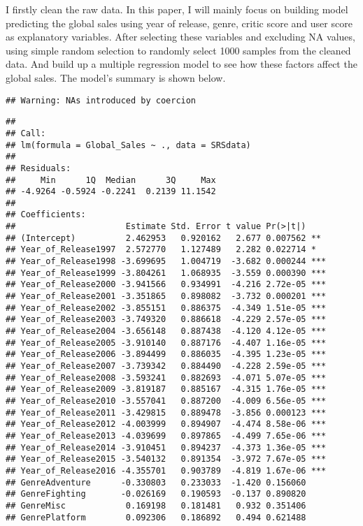 \documentclass[
]{article}
\begin{document}
I firstly clean the raw data. In this paper, I will mainly focus on
building model predicting the global sales using year of release, genre,
critic score and user score as explanatory variables. After selecting
these variables and excluding NA values, using simple random selection
to randomly select 1000 samples from the cleaned data. And build up a
multiple regression model to see how these factors affect the global
sales. The model's summary is shown below.

\begin{verbatim}
## Warning: NAs introduced by coercion
\end{verbatim}

\begin{verbatim}
## 
## Call:
## lm(formula = Global_Sales ~ ., data = SRSdata)
## 
## Residuals:
##     Min      1Q  Median      3Q     Max 
## -4.9264 -0.5924 -0.2241  0.2139 11.1542 
## 
## Coefficients:
##                      Estimate Std. Error t value Pr(>|t|)    
## (Intercept)          2.462953   0.920162   2.677 0.007562 ** 
## Year_of_Release1997  2.572770   1.127489   2.282 0.022714 *  
## Year_of_Release1998 -3.699695   1.004719  -3.682 0.000244 ***
## Year_of_Release1999 -3.804261   1.068935  -3.559 0.000390 ***
## Year_of_Release2000 -3.941566   0.934991  -4.216 2.72e-05 ***
## Year_of_Release2001 -3.351865   0.898082  -3.732 0.000201 ***
## Year_of_Release2002 -3.855151   0.886375  -4.349 1.51e-05 ***
## Year_of_Release2003 -3.749320   0.886618  -4.229 2.57e-05 ***
## Year_of_Release2004 -3.656148   0.887438  -4.120 4.12e-05 ***
## Year_of_Release2005 -3.910140   0.887176  -4.407 1.16e-05 ***
## Year_of_Release2006 -3.894499   0.886035  -4.395 1.23e-05 ***
## Year_of_Release2007 -3.739342   0.884490  -4.228 2.59e-05 ***
## Year_of_Release2008 -3.593241   0.882693  -4.071 5.07e-05 ***
## Year_of_Release2009 -3.819187   0.885167  -4.315 1.76e-05 ***
## Year_of_Release2010 -3.557041   0.887200  -4.009 6.56e-05 ***
## Year_of_Release2011 -3.429815   0.889478  -3.856 0.000123 ***
## Year_of_Release2012 -4.003999   0.894907  -4.474 8.58e-06 ***
## Year_of_Release2013 -4.039699   0.897865  -4.499 7.65e-06 ***
## Year_of_Release2014 -3.910451   0.894237  -4.373 1.36e-05 ***
## Year_of_Release2015 -3.540132   0.891354  -3.972 7.67e-05 ***
## Year_of_Release2016 -4.355701   0.903789  -4.819 1.67e-06 ***
## GenreAdventure      -0.330803   0.233033  -1.420 0.156060    
## GenreFighting       -0.026169   0.190593  -0.137 0.890820    
## GenreMisc            0.169198   0.181481   0.932 0.351406    
## GenrePlatform        0.092306   0.186892   0.494 0.621488    

\end{verbatim}
\end{document}
